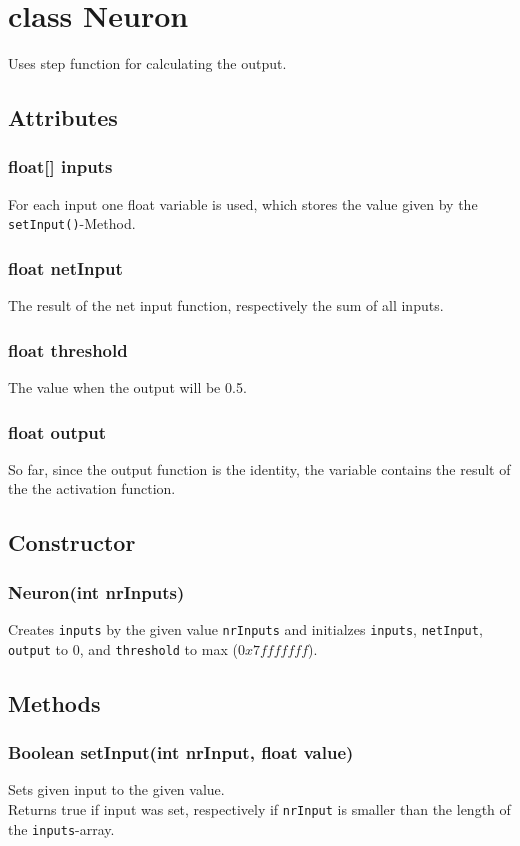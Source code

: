 \chapter{class Neuron}
Uses step function for calculating the output.

\section{Attributes}
\subsection{float[] inputs}
For each input one float variable is used, which stores the value given by the \texttt{setInput()}-Method.

\subsection{float netInput}
The result of the net input function, respectively the sum of all inputs.

\subsection{float threshold}
The value when the output will be 0.5.

\subsection{float output}
So far, since the output function is the identity, the variable contains the result of the the activation function.

\section{Constructor}
\subsection{Neuron(int nrInputs)}
Creates \texttt{inputs} by the given value \texttt{nrInputs} and initialzes \texttt{inputs}, \texttt{netInput}, \texttt{output} to 0, and \texttt{threshold} to max ($0x7fffffff$).

\section{Methods}
\subsection{Boolean setInput(int nrInput, float value)}
Sets given input to the given value.\\
Returns true if input was set, respectively if \texttt{nrInput} is smaller than the length of the \texttt{inputs}-array.
	
